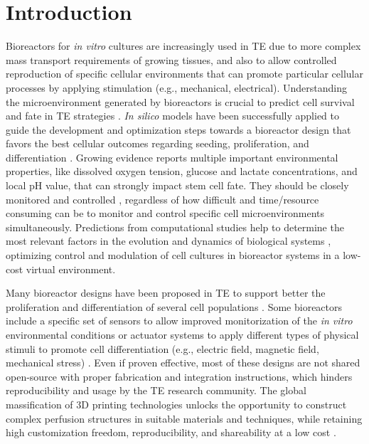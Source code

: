 \section{Introduction}
Bioreactors for \textit{in vitro} cultures are increasingly used in \acs{TE} due to more complex mass transport requirements of growing tissues, and also to allow controlled reproduction of specific cellular environments that can promote particular cellular processes by applying stimulation (e.g., mechanical, electrical). Understanding the microenvironment generated by bioreactors is crucial to predict cell survival and fate in TE strategies \cite{Reina-Romo2019-ry}. \textit{In silico} models have been successfully applied to guide the development and optimization steps towards a bioreactor design that favors the best cellular outcomes regarding seeding, proliferation, and differentiation \cite{Engel2021-fk, Spencer2013-pg, Perier-Metz2021-bj}. Growing evidence reports multiple important environmental properties, like dissolved oxygen tension, glucose and lactate concentrations, and local pH value, that can strongly impact stem cell fate. They should be closely monitored and controlled \cite{Klein2021-dz, Klein2022-yj, Monfoulet2014-ef, Seddiqi2020-uo, Beskardes2018-fq}, regardless of how difficult and time/resource consuming can be to monitor and control specific cell microenvironments simultaneously. Predictions from computational studies help to determine the most relevant factors in the evolution and dynamics of biological systems \cite{Geris2018-tz}, optimizing control and modulation of cell cultures in bioreactor systems in a low-cost virtual environment.

Many bioreactor designs have been proposed in \acs{TE} to support better the proliferation and differentiation of several cell populations \cite{Smith2018-he, Montorsi2022-qm}. Some bioreactors include a specific set of sensors to allow improved monitorization of the \textit{in vitro} environmental conditions or actuator systems to apply different types of physical stimuli to promote cell differentiation (e.g., electric field, magnetic field, mechanical stress) \cite{Lim2022-dr}. Even if proven effective, most of these designs are not shared open-source with proper fabrication and integration instructions, which hinders reproducibility and usage by the \acs{TE} research community. The global massification of \acs{3D} printing technologies unlocks the opportunity to construct complex perfusion structures in suitable materials and techniques, while retaining high customization freedom, reproducibility, and shareability at a low cost \cite{Gensler2020-in, Haleem2020-oj}.

